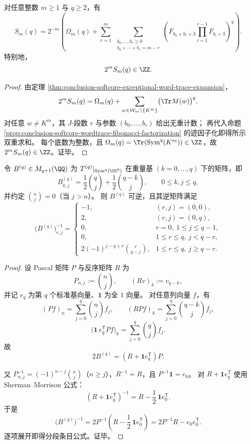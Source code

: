 \begin{theorem}[全阶例外幂和的组合闭式]\label{thm:conclusion-softcore-exceptional-moments-combinatorial-closed-form}
对任意整数 \(m\ge 1\) 与 \(q\ge 2\)，有
\[
S_m(q)=2^{-m}\left(
\Omega_m(q)+
\sum_{r=1}^{m}\ 
\sum_{\substack{b_0,\dots,b_r\ge 0\\ b_0+\cdots+b_r=m-r}}
\left(
F_{b_0+b_r+3}\prod_{i=1}^{r-1}F_{b_i+3}
\right)^q
\right).
\]
特别地，
\[
2^m S_m(q)\in\ZZ.
\]
\end{theorem}
\begin{proof}
由定理 \ref{thm:conclusion-softcore-exceptional-word-trace-expansion}，
\[
2^m S_m(q)=\Omega_m(q)+
\sum_{w\in\mathcal W_m\setminus\{K^m\}}\bigl(\Tr M(w)\bigr)^q.
\]
对任意 \(w\neq K^m\)，其 \(J\)-段数 \(r\) 与参数 \((b_0,\dots,b_r)\) 给出无重计数；
再代入命题 \ref{prop:conclusion-softcore-wordtrace-fibonacci-factorization} 的迹因子化即得所示双重求和。
每个底数为整数，且 \(\Omega_m(q)=\Tr(\operatorname{Sym}^q(K^m))\in\ZZ\)，故 \(2^mS_m(q)\in\ZZ\)。证毕。
\end{proof}

\begin{theorem}[重量表示矩阵的显式整数逆]\label{thm:conclusion-softcore-weight-matrix-explicit-inverse}
令 \(B^{(q)}\in M_{q+1}(\QQ)\) 为
\(
T^{(q)}|_{\operatorname{Sym}^q(\CC^2)}
\)
在重量基 \((k=0,\dots,q)\) 下的矩阵，即
\[
B^{(q)}_{k,j}
=\frac12\binom{q}{j}+\frac12\binom{q-k}{j},
\qquad 0\le k,j\le q,
\]
并约定 \(\binom{n}{j}=0\)（当 \(j>n\)）。
则 \(B^{(q)}\) 可逆，且其逆矩阵满足
\[
\bigl(B^{(q)}\bigr)^{-1}_{r,j}=
\begin{cases}
-1,&(r,j)=(0,0),\\[3pt]
2,&(r,j)=(0,q),\\[3pt]
0,&r=0,\ 1\le j\le q-1,\\[3pt]
0,&1\le r\le q,\ j<q-r,\\[4pt]
2(-1)^{j-q+r}\binom{r}{q-j},&1\le r\le q,\ j\ge q-r.
\end{cases}
\]
\end{theorem}
\begin{proof}
设 Pascal 矩阵 \(P\) 与反序矩阵 \(R\) 为
\[
P_{n,j}:=\binom{n}{j},\qquad
(Rv)_k:=v_{q-k},
\]
并记 \(e_q\) 为第 \(q\) 个标准基向量、\(\mathbf 1\) 为全 \(1\) 向量。
对任意列向量 \(f\)，有
\[
(Pf)_n=\sum_{j=0}^{q}\binom{n}{j}f_j,\qquad
(RPf)_k=\sum_{j=0}^{q}\binom{q-k}{j}f_j,
\]
\[
\bigl(\mathbf 1\,e_q^{\mathsf T}Pf\bigr)_k
=\sum_{j=0}^{q}\binom{q}{j}f_j.
\]
故
\[
2B^{(q)}=(R+\mathbf 1 e_q^{\mathsf T})P.
\]

又 \(P^{-1}_{n,j}=(-1)^{n-j}\binom{n}{j}\)（\(n\ge j\)），\(R^{-1}=R\)，且 \(P^{-1}\mathbf 1=e_0\)。
对 \(R+\mathbf 1e_q^{\mathsf T}\) 使用 Sherman--Morrison 公式：
\[
(R+\mathbf 1e_q^{\mathsf T})^{-1}
=R-\frac12\,\mathbf 1e_0^{\mathsf T}.
\]
于是
\[
\bigl(B^{(q)}\bigr)^{-1}
=2P^{-1}\!\left(R-\frac12\,\mathbf 1e_0^{\mathsf T}\right)
=2P^{-1}R-e_0e_0^{\mathsf T}.
\]
逐项展开即得分段条目公式。证毕。
\end{proof}

